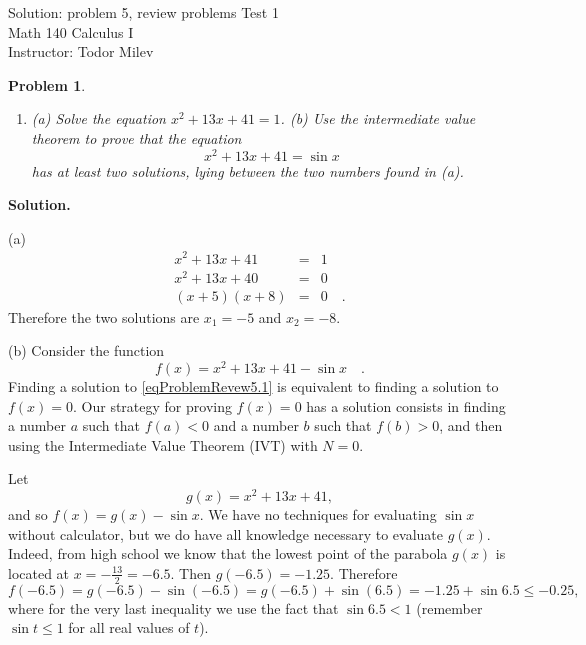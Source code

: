 \documentclass{article}
\newtheorem{problem}{Problem}
\begin{document}
\begin{center}
\Large
Solution: problem 5, review problems Test 1\\ Math 140 Calculus I \\ \normalsize Instructor: Todor Milev
\end{center}



\begin{problem}~
\begin{enumerate}
\item (a) Solve the equation $x^2+13x+41=1$.  (b) Use the intermediate value theorem to prove that the equation 
\begin{equation}\label{eqProblemRevew5.1}
x^2+13x+41=\sin  x
\end{equation} has at least two solutions, lying between the two numbers found in (a).
\end{enumerate}
\end{problem}
\textbf{Solution.} 

\noindent (a) 
\begin{eqnarray*}
x^2+13x+41&=&1\\
x^2+13x+40&=&0\\
(x+5)(x+8)&=&0\quad .
\end{eqnarray*}
Therefore the two solutions are $x_1=-5$ and $x_2=-8$.

\noindent (b) Consider the function
\[
f(x)=x^2+13x+41-\sin x\quad. 
\]
Finding a solution to \eqref{eqProblemRevew5.1} is equivalent to finding a solution to $f(x)=0$. Our strategy for proving $f(x)=0$ has a solution consists in finding a number $a$ such that $f(a)<0$ and a number $b$ such that $f(b)>0$, and then using the Intermediate Value Theorem (IVT) with $N=0$. 

Let 
\[
g(x)=x^2+13x+41,
\]
and so $f(x)=g(x)-\sin x$. We have no techniques for evaluating $\sin x$ without calculator, but we do have all knowledge necessary to evaluate $g(x)$. Indeed, from high school we know that the lowest point of the parabola $g(x)$ is located at $x=-\frac{13}2=-6.5$. Then $g(-6.5)= -1.25$. Therefore 
\[
f(-6.5)=g(-6.5)-\sin(-6.5)= g(-6.5)+\sin (6.5)=-1.25+\sin 6.5 \leq -0.25, 
\]
where for the very last inequality we use the fact that $\sin 6.5< 1 $ (remember $\sin t\leq 1$ for all real values of $t$).
\end{document}
